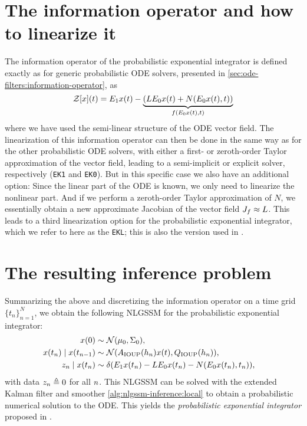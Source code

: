 \documentclass{mimosis}
\begin{document}
\section{The information operator and how to linearize it}
\label{sec:orgeb18948}
\label{sec:expint:linearization}
The information operator of the probabilistic exponential integrator is defined exactly as for generic probabilistic ODE solvers,
presented in \cref{sec:ode-filters:information-operator},
as
\begin{equation}
  \label{eq:probexpint:infoop}
  \mathcal{Z}[\st](t)
    = \proj{1} \st(t) - \underbrace{\left( L \proj{0} \st(t) + N(\proj{0} \st(t), t) \right)}_{\vf(\proj{0} \st(t), t)}
\end{equation}
where we have used the semi-linear structure of the ODE vector field.
The linearization of this information operator can then be done in the same way as for the other probabilistic ODE solvers, with either a first- or zeroth-order Taylor approximation of the vector field, leading to a semi-implicit or explicit solver, respectively (\texttt{EK1} and \texttt{EK0}).
But in this specific case we also have an additional option:
Since the linear part of the ODE is known, we only need to linearize the nonlinear part. And if we perform a zeroth-order Taylor approximation of \(N\), we essentially obtain a new approximate Jacobian of the vector field
\(\jac{\vf} \approx L\).
This leads to a third linearization option for the probabilistic exponential integrator, which we refer to here as the \texttt{EKL};
this is also the version used in
\probexpint{}.
\section{The resulting inference problem}
\label{sec:orge016d26}
Summarizing the above and discretizing the information operator on a time grid \(\{t_n\}_{n=1}^N\), we obtain the following NLGSSM for the probabilistic exponential integrator:
\begin{subequations}
\begin{align}
  \st(0) &\sim \N( \mu_0, \Sigma_0 ),  &&\\
  \st(t_\idxt) \mid \st(t_{\idxt-1}) &\sim \N( \transA_{\IOUP} (h_\idxt) \st(t), \transC_{\IOUP} (h_\idxt) ), \\
  \sobs_\idxt \mid \st(t_\idxt) &\sim \dirac( \proj{1} \st(t_\idxt) - L \proj{0} \st(t_\idxt) - N(\proj{0} \st(t_\idxt), t_\idxt) ),
\end{align}
\end{subequations}
with data \(z_n \triangleq 0\) for all \(n\).
This NLGSSM can be solved with the extended Kalman filter and smoother \cref{alg:nlgssm-inference:local} to obtain a probabilistic numerical solution to the ODE.
This yields the \emph{probabilistic exponential integrator} proposed in
\probexpint{}.
\end{document}
